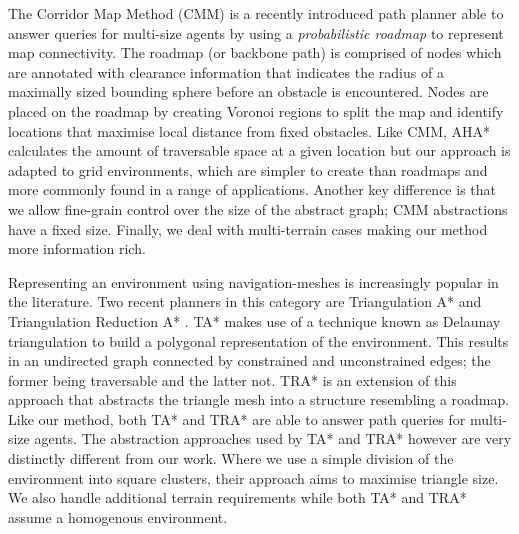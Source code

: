 \indent The Corridor Map Method (CMM) \cite{geraerts07} is a recently introduced path planner able to answer queries for multi-size agents by using a \emph{probabilistic roadmap} to represent map connectivity. 
The roadmap (or backbone path) is comprised of nodes which are annotated with clearance information that indicates the radius of a maximally sized bounding sphere before an obstacle is encountered. 
Nodes are placed on the roadmap by creating Voronoi regions to split the map and identify locations that maximise local distance from fixed obstacles. 
Like CMM, AHA* calculates the amount of traversable space at a given location but our approach is adapted to grid environments, which are simpler to create than roadmaps and more commonly found in a range of applications. 
Another key difference is that we allow fine-grain control over the size of the abstract graph; CMM abstractions have a fixed size.
Finally, we deal with multi-terrain cases making our method more information rich. 
\par \indent 
Representing an environment using navigation-meshes is increasingly popular in the literature. 
Two recent planners in this category are Triangulation A* and Triangulation Reduction A* \cite{demyen07}. 
TA* makes use of a technique known as Delaunay triangulation to build a polygonal representation of the environment. 
This results in an undirected graph connected by constrained and unconstrained edges; the former being traversable and the latter not. 
TRA* is an extension of this approach that abstracts the triangle mesh into a structure resembling a roadmap. 
Like our method, both TA* and TRA* are able to answer path queries for multi-size agents. 
The abstraction approaches used by TA* and TRA* however are very distinctly different from our work. 
Where we use a simple division of the environment into square clusters, their approach aims to maximise triangle size. 
We also handle additional terrain requirements while both TA* and TRA* assume a homogenous environment.

